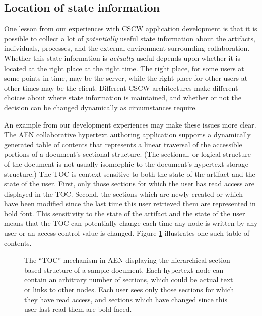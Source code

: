 \subsection{Location of state information}

One lesson from our experiences with CSCW application development is that
it is possible to collect a lot of {\em potentially} useful state information
about the artifacts, individuals, processes, and the external environment
surrounding collaboration. Whether this state information is {\em actually}
useful depends upon whether it is located at the right place at the right
time.  The right place, for some users at some points in time, may be the
server, while the right place for other users at other times may be the
client.  Different CSCW architectures make different choices about where
state information is maintained, and whether or not the decision can be
changed dynamically as circumstances require.

An example from our development experiences may make these issues more
clear. The AEN collaborative hypertext authoring application supports a
dynamically generated table of contents that represents a linear traversal of
the accessible portions of a document's sectional structure.
(The sectional, or logical structure of the document is not usually
isomorphic to the document's hypertext storage structure.)  The TOC is
context-sensitive to both the state of the artifact and the state of the
user.  First, only those sections for which the user has read access are
displayed in the TOC. Second, the sections which are newly created or which
have been modified since the last time this user retrieved them are
represented in bold font.  This sensitivity to the state of the artifact
and the state of the user means that the TOC can potentially change each
time any node is written by any user or an access control value is changed.
Figure \ref{fig:toc} illustrates one such table of contents.

\begin{figure}[t]
  \centerline{} 
\caption{The ``TOC'' mechanism in AEN displaying the hierarchical section-based
structure 
of a sample document. Each hypertext node can contain an arbitrary number
of sections, which could be actual text or links to other nodes. 
Each user sees only those sections for which they have read access, and 
sections which have changed since this user last read them are bold faced.}
\label{fig:toc}
\end{figure}

